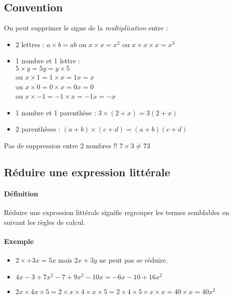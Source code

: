 \documentclass[
	a4paper,
	twocolumn=false,
	12pts,
	DIV=calc]%
	{scrartcl}
\begin{document}
\subsection{Convention}
On peut supprimer le signe de la \emph{multiplication} entre :
\begin{itemize}
	\item 2 lettres : $a \times b = ab$ ou $x \times x = x^2$ ou $x \times x \times x = x^3$
	\item 1 nombre et 1 lettre :\\
		$5 \times y=5 y =y \times 5$\\
		ou $x \times 1=1 \times x=1 x=x$\\
		ou $x \times 0=0 \times x=0 x=0$\\
		ou $x \times −1=−1 \times x=−1 x=−x$\\
	\item 1 nombre et 1 parenthèse : $3 \times (2+x)=3(2+x)$
	\item 2 parenthèses : $(a+b) \times (c +d)=(a+b)(c+ d)$
\end{itemize}

\begin{attention}
Pas de suppression entre 2 nombres !! $7×3 \neq 73$
\end{attention}

\subsection{Réduire une expression littérale}

\paragraph{Définition} Réduire une expression littérale signifie regrouper les termes semblables en suivant les règles de calcul.

\paragraph{Exemple}
\begin{itemize}%
	\item $2 \times +3 x=5 x$ mais $2 x +3 y$ ne peut pas se réduire.
	\item $4 x−3+7 x^2 −7+9 x^2 −10 x=−6 x−10+16 x^2$
	\item $2 x\times 4 x \times 5=2 \times x \times 4\times x\times 5=2\times 4\times 5\times x\times x=40\times x =40 x^2$
\end{itemize}
\end{document}
